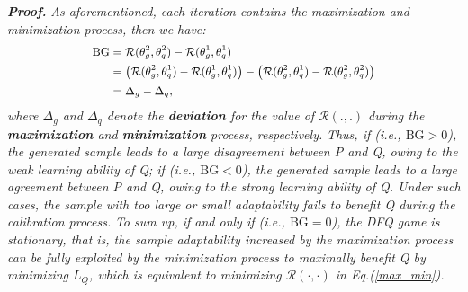 \noindent \emph{\textbf{Proof.} }
\noindent \emph{As aforementioned, each iteration contains the maximization and minimization process, then we have:}
\noindent \emph{
\begin{equation}
\begin{small}
\begin{aligned}
\text{{BG}}&=\mathcal{R}(\theta^2_g,\theta^2_q)-\mathcal{R}(\theta_g^1,\theta_q^1) \\
&=\big(\mathcal{R}(\theta^2_g,\theta_q^1) - \mathcal{R}(\theta_g^1,\theta_q^1)\big) - \big(\mathcal{R}(\theta^2_g,\theta_q^1) - \mathcal{R}(\theta^2_g,\theta^2_q)\big)  \\
&=\Delta_g-\Delta_q,
\end{aligned}
\end{small}
\label{}
\end{equation}
where $\Delta_g$ and $\Delta_q$ denote the \textbf{deviation} for the value of $\mathcal{R}(.,.)$ during the \textbf{maximization} and \textbf{minimization} process, respectively.
}
 \emph{
Thus, if  (i.e., $\text{{BG}}>0$), the generated sample leads to a large disagreement between P and Q, owing to the weak learning ability of Q; if  (i.e., $\text{{BG}}<0$), the generated sample leads to a large agreement between P and Q, owing to the strong learning ability of Q. Under such cases, the sample with too large or small adaptability fails to benefit Q during the calibration process. 
}
\noindent \emph{
To sum up, if and only if  (i.e., $\text{{BG}}=0$), the DFQ game is stationary, that is, the sample adaptability increased by the maximization process can be fully exploited by the minimization process to maximally benefit Q by minimizing $L_Q$, which is equivalent to minimizing  $\mathcal{R}(\cdot,\cdot)$  in Eq.(\ref{max_min}).
}   


